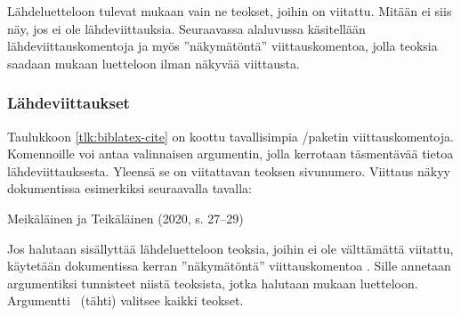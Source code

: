 Lähdeluetteloon tulevat mukaan vain ne teokset, joihin on viitattu.
Mitään ei siis näy, jos ei ole lähdeviittauksia. Seuraavassa alaluvussa
käsitellään lähdeviittauskomentoja ja myös ''näkymätöntä''
viittauskomentoa, jolla teoksia saadaan mukaan luetteloon ilman näkyvää
viittausta.

\subsubsection{Lähdeviittaukset}


Taulukkoon \ref{tlk:biblatex-cite} on koottu tavallisimpia
\-/paketin viittauskomentoja. Komennoille voi antaa
valinnaisen argumentin, jolla kerrotaan täsmentävää tietoa
lähdeviittauksesta. Yleensä se on viitattavan teoksen sivunumero.
Viittaus näkyy dokumentissa esimerkiksi seuraavalla tavalla:

\begin{koodilohkosis}
\textcite[27--29]{johdatus} %
\end{koodilohkosis}

\begin{tulossis}
  Meikäläinen ja Teikäläinen (2020, s. 27--29)
\end{tulossis}

Jos halutaan sisällyttää lähdeluetteloon teoksia, joihin ei ole
välttämättä viitattu, käytetään dokumentissa kerran ''näkymätöntä''
viittauskomentoa . Sille annetaan argumentiksi
tunnisteet niistä teoksista, jotka halutaan mukaan luetteloon.
Argumentti~\koodi{*} (tähti) valitsee kaikki teokset.

\begin{koodilohkosis}
\nocite{meikäläinen, teikäläinen} %
\nocite{*}                        %
\end{koodilohkosis}

